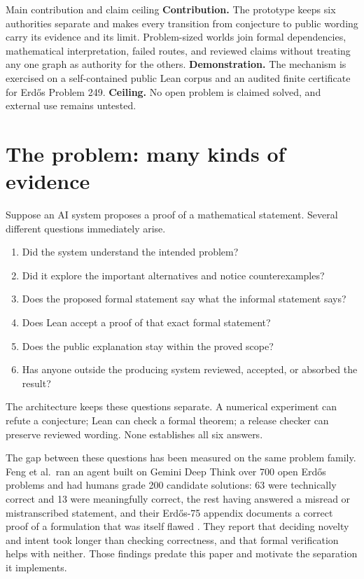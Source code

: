 \documentclass[10pt]{article}
\begin{document}
\begin{paperresult}{Main contribution and claim ceiling}
\textbf{Contribution.} The prototype keeps six authorities separate and
makes every transition from conjecture to public wording carry its evidence
and its limit.  Problem-sized worlds join formal dependencies, mathematical
interpretation, failed routes, and reviewed claims without treating any one
graph as authority for the others.  \textbf{Demonstration.} The mechanism is
exercised on a self-contained public Lean corpus and an audited finite
certificate for Erd\H{o}s Problem 249.  \textbf{Ceiling.} No open problem is
claimed solved, and external use remains untested.
\end{paperresult}

\section{The problem: many kinds of evidence}

Suppose an AI system proposes a proof of a mathematical statement. Several
different questions immediately arise.

\begin{enumerate}
\item Did the system understand the intended problem?
\item Did it explore the important alternatives and notice counterexamples?
\item Does the proposed formal statement say what the informal statement says?
\item Does Lean accept a proof of that exact formal statement?
\item Does the public explanation stay within the proved scope?
\item Has anyone outside the producing system reviewed, accepted, or absorbed
      the result?
\end{enumerate}

The architecture keeps these questions separate. A numerical experiment can
refute a conjecture; Lean can check a formal theorem; a release checker can
preserve reviewed wording. None establishes all six answers.

The gap between these questions has been measured on the same problem family.
Feng et al.\ ran an agent built on Gemini Deep Think over 700 open
Erd\H{o}s problems and had humans grade 200 candidate solutions: 63 were
technically correct and 13 were meaningfully correct, the rest having answered
a misread or mistranscribed statement, and their Erd\H{o}s-75 appendix
documents a correct proof of a formulation that was itself flawed
\cite{aletheia}. They report that deciding novelty and intent took longer
than checking correctness, and that formal verification helps with neither.
Those findings predate this paper and motivate the separation it
implements.
\end{document}
